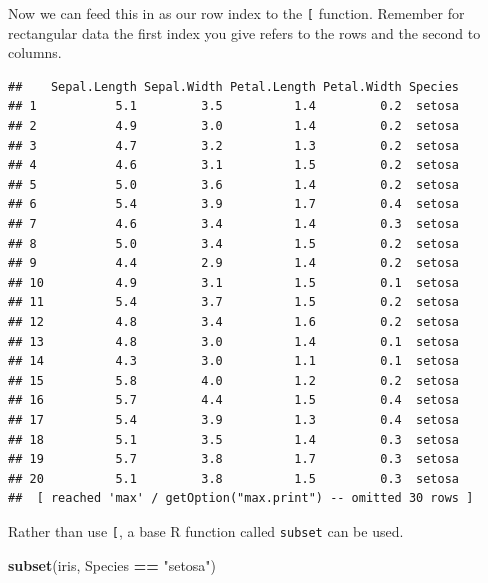 \documentclass[
]{book}
\newenvironment{Shaded}{\begin{snugshade}}{\end{snugshade}}
\newcommand{\KeywordTok}[1]{\textcolor[rgb]{0.13,0.29,0.53}{\textbf{#1}}}
\newcommand{\NormalTok}[1]{#1}
\newcommand{\OperatorTok}[1]{\textcolor[rgb]{0.81,0.36,0.00}{\textbf{#1}}}
\newcommand{\StringTok}[1]{\textcolor[rgb]{0.31,0.60,0.02}{#1}}
\theoremstyle{definition}
\theoremstyle{definition}
\theoremstyle{definition}
\theoremstyle{remark}
\begin{document}
Now we can feed this in as our row index to the \texttt{{[}} function. Remember for rectangular data the first index you give refers to the rows and the second to columns.

\begin{Shaded}
\end{Shaded}

\begin{verbatim}
##    Sepal.Length Sepal.Width Petal.Length Petal.Width Species
## 1           5.1         3.5          1.4         0.2  setosa
## 2           4.9         3.0          1.4         0.2  setosa
## 3           4.7         3.2          1.3         0.2  setosa
## 4           4.6         3.1          1.5         0.2  setosa
## 5           5.0         3.6          1.4         0.2  setosa
## 6           5.4         3.9          1.7         0.4  setosa
## 7           4.6         3.4          1.4         0.3  setosa
## 8           5.0         3.4          1.5         0.2  setosa
## 9           4.4         2.9          1.4         0.2  setosa
## 10          4.9         3.1          1.5         0.1  setosa
## 11          5.4         3.7          1.5         0.2  setosa
## 12          4.8         3.4          1.6         0.2  setosa
## 13          4.8         3.0          1.4         0.1  setosa
## 14          4.3         3.0          1.1         0.1  setosa
## 15          5.8         4.0          1.2         0.2  setosa
## 16          5.7         4.4          1.5         0.4  setosa
## 17          5.4         3.9          1.3         0.4  setosa
## 18          5.1         3.5          1.4         0.3  setosa
## 19          5.7         3.8          1.7         0.3  setosa
## 20          5.1         3.8          1.5         0.3  setosa
##  [ reached 'max' / getOption("max.print") -- omitted 30 rows ]
\end{verbatim}

Rather than use \texttt{{[}}, a base R function called \texttt{subset} can be used.

\begin{Shaded}
\begin{Highlighting}[]
\KeywordTok{subset}\NormalTok{(iris, Species }\OperatorTok{==}\StringTok{ "setosa"}\NormalTok{)}
\end{Highlighting}
\end{Shaded}
\end{document}
